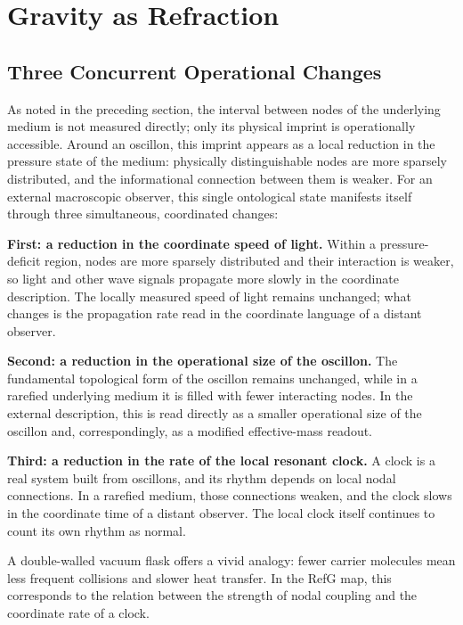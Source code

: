 \documentclass[11pt,a4paper]{article}
\begin{document}
\section{Gravity as Refraction}

\subsection{Three Concurrent Operational Changes}

As noted in the preceding section, the interval between nodes of the underlying medium is not measured directly; only its physical imprint is operationally accessible. Around an oscillon, this imprint appears as a local reduction in the pressure state of the medium: physically distinguishable nodes are more sparsely distributed, and the informational connection between them is weaker. For an external macroscopic observer, this single ontological state manifests itself through three simultaneous, coordinated changes:

\noindent\textbf{First: a reduction in the coordinate speed of light.} Within a pressure-deficit region, nodes are more sparsely distributed and their interaction is weaker, so light and other wave signals propagate more slowly in the coordinate description. The locally measured speed of light remains unchanged; what changes is the propagation rate read in the coordinate language of a distant observer.

\noindent\textbf{Second: a reduction in the operational size of the oscillon.} The fundamental topological form of the oscillon remains unchanged, while in a rarefied underlying medium it is filled with fewer interacting nodes. In the external description, this is read directly as a smaller operational size of the oscillon and, correspondingly, as a modified effective-mass readout.

\noindent\textbf{Third: a reduction in the rate of the local resonant clock.} A clock is a real system built from oscillons, and its rhythm depends on local nodal connections. In a rarefied medium, those connections weaken, and the clock slows in the coordinate time of a distant observer. The local clock itself continues to count its own rhythm as normal.

A double-walled vacuum flask offers a vivid analogy: fewer carrier molecules mean less frequent collisions and slower heat transfer. In the RefG map, this corresponds to the relation between the strength of nodal coupling and the coordinate rate of a clock.
\end{document}
